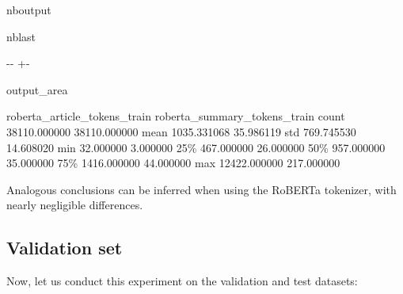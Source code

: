 \documentclass[letterpaper,10pt,english]{sphinxmanual}
\newlength\nbsphinxcodecellspacing
\begin{document}
\begin{sphinxuseclass}{nboutput}
\begin{sphinxuseclass}{nblast}
{

\kern-\sphinxverbatimsmallskipamount\kern-\baselineskip
\kern+\FrameHeightAdjust\kern-\fboxrule
\vspace{\nbsphinxcodecellspacing}

\begin{sphinxuseclass}{output_area}
\begin{sphinxuseclass}{}


\begin{sphinxVerbatim}[commandchars=\\\{\}]
\llap{\color{nbsphinxout}[69]:\,\hspace{\fboxrule}\hspace{\fboxsep}}       roberta\_article\_tokens\_train  roberta\_summary\_tokens\_train
count                  38110.000000                  38110.000000
mean                    1035.331068                     35.986119
std                      769.745530                     14.608020
min                       32.000000                      3.000000
25\%                      467.000000                     26.000000
50\%                      957.000000                     35.000000
75\%                     1416.000000                     44.000000
max                    12422.000000                    217.000000
\end{sphinxVerbatim}



\end{sphinxuseclass}
\end{sphinxuseclass}
}

\end{sphinxuseclass}
\end{sphinxuseclass}
\sphinxAtStartPar
Analogous conclusions can be inferred when using the RoBERTa tokenizer, with nearly negligible differences.


\subsection{Validation set}
\label{\detokenize{eda:Validation-set}}
\sphinxAtStartPar
Now, let us conduct this experiment on the validation and test datasets:
\end{document}
